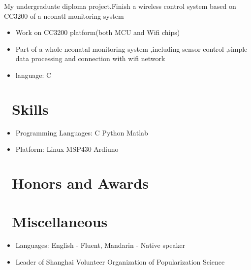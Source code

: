 \documentclass{resume}
\begin{document}
My undergraduate diploma project.Finish a wireless control system based on CC3200 of a neonatl monitoring system
\begin{itemize}
  \item Work on CC3200 platform(both MCU and Wifi chips)
  \item Part of a whole neonatal monitoring system ,including sensor control ,simple data processing and connection with wifi network 
  \item language: C 
\end{itemize}




\section{\faCogs\ Skills}
\begin{itemize}[parsep=0.5ex]
  \item Programming Languages: C  Python Matlab
  \item Platform: Linux MSP430 Ardiuno
\end{itemize}

\section{\faHeartO\ Honors and Awards}


\section{\faInfo\ Miscellaneous}
\begin{itemize}[parsep=0.5ex]
  \item Languages: English - Fluent, Mandarin - Native speaker
  \item Leader of  Shanghai Volunteer Organization of Popularization Science 
\end{itemize}

%
%
\end{document}
